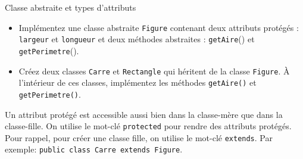 	
	\begin{Exercice}[15 minutes]{Classe abstraite et types d'attributs}
	\begin{itemize}
		\item Implémentez une classe abstraite \lstinline{Figure} contenant deux attributs protégés : \lstinline{largeur} et \lstinline{longueur} et deux méthodes abstraites : \lstinline{getAire}() et \lstinline{getPerimetre}().
		\item Créez deux classes \lstinline{Carre} et \lstinline{Rectangle} qui héritent de la classe \lstinline{Figure}. À l'intérieur de ces classes, implémentez les méthodes \lstinline{getAire()} et \lstinline{getPerimetre()}.
	\end{itemize}
	
	\begin{conseil}
		Un attribut protégé est accessible aussi bien dans la classe-mère que dans la classe-fille. On utilise le mot-clé \lstinline{protected} pour rendre des attributs protégés. \\
		Pour rappel, pour créer une classe fille, on utilise le mot-clé \lstinline{extends}. Par exemple: \lstinline{public class Carre extends Figure}.
	\end{conseil}

	\begin{solution}
		 
	\end{solution}
	\begin{solution}
		 
	\end{solution}
	\begin{solution}
		
	\end{solution} 
	\begin{solution}
		 
	\end{solution}
	\end{Exercice}
	
